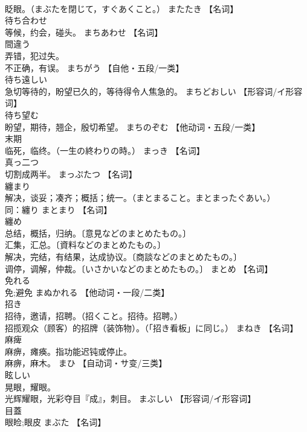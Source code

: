 \documentclass[8pt]{extreport}
\begin{document}
\begin{CJK}{UTF8}{min}
\\	眨眼。（まぶたを閉じて，すぐあくこと。）	またたき		【名词】
\\	待ち合わせ	
\\	等候，约会，碰头。	まちあわせ		【名词】
\\	間違う	
\\	弄错，犯过失。 
\\	不正确，有误。	まちがう		【自他・五段/一类】
\\	待ち遠しい	
\\	急切等待的，盼望已久的，等待得令人焦急的。	まちどおしい		【形容词/イ形容词】
\\	待ち望む	
\\	盼望，期待，翘企，殷切希望。	まちのぞむ		【他动词・五段/一类】
\\	末期	
\\	临死，临终。（一生の終わりの時。）	まっき		【名词】
\\	真っ二つ	
\\	切割成两半。	まっぷたつ		【名词】
\\	纏まり	
\\	解决，谈妥；凑齐；概括；统一。（まとまること。まとまったぐあい。） 
\\	同：纏り	まとまり		【名词】
\\	纏め	
\\	总结，概括，归纳。〔意見などのまとめたもの。〕 
\\	汇集，汇总。〔資料などのまとめたもの。〕 
\\	解决，完结，有结果，达成协议。〔商談などのまとめたもの。〕 
\\	调停，调解，仲裁。〔いさかいなどのまとめたもの。〕	まとめ		【名词】
\\	免れる	
\\	免;避免	まぬかれる		【他动词・一段/二类】
\\	招き	
\\	招待，邀请，招聘。（招くこと。招待。招聘。） 
\\	招揽观众（顾客）的招牌（装饰物）。（「招き看板」に同じ。）	まねき		【名词】
\\	麻痺	
\\	麻痹，瘫痪。指功能迟钝或停止。 
\\	麻痹，麻木。	まひ		【自动词・サ变/三类】
\\	眩しい	
\\	晃眼，耀眼。 
\\	光辉耀眼，光彩夺目『成』，刺目。	まぶしい		【形容词/イ形容词】
\\	目蓋	
\\	眼睑;眼皮	まぶた		【名词】

\end{CJK}
\end{document}
